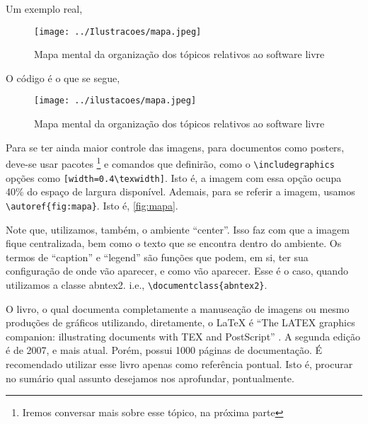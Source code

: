 \documentclass[12pt,
brazilian,
a5paper]{abntex2} %
\begin{document}
{        Um exemplo real,

        \begin{figure}[!htb]
          \begin{center}
            \caption{\label{fig:mapa}Mapa mental da organização dos tópicos relativos ao software livre}
            \texttt{[image: ../Ilustracoes/mapa.jpeg]}
          \end{center}
        \end{figure}

        \clearpage

        O código é o que se segue,


        \begin{verbnobox}[\fontsize{9.5pt}{9.5pt}\selectfont]
          \begin{figure}[!htb]
            \begin{center}
              \caption{\label{fig:mapa}Mapa mental da organização dos tópicos relativos ao software livre}
              \texttt{[image: ../ilustacoes/mapa.jpeg]}
            \end{center}
          \end{figure}
        \end{verbnobox}


        Para se ter ainda maior controle das imagens, para documentos como
        \textsf{posters}, deve-se usar pacotes \footnote{Iremos conversar
          mais sobre esse tópico, na próxima parte} e comandos que definirão,
        como o \verb+\includegraphics+ opções como
        \verb+[width=0.4\texwidth]+. Isto é, a imagem com essa opção ocupa
        40\% do espaço de largura disponível. Ademais, para se referir
        a imagem, usamos \verb+\autoref{fig:mapa}+. Isto é,
        \autoref{fig:mapa}.

        Note que, utilizamos, também, o ambiente ``center''. Isso faz com
        que a imagem fique centralizada, bem como o texto que se encontra
        dentro do ambiente. Os termos de ``caption'' e ``legend'' são
        funções que podem, em si, ter sua configuração de onde vão
        aparecer, e como vão aparecer. Esse é o caso, quando utilizamos a
        classe abntex2. i.e., \verb+\documentclass{abntex2}+. \cite{abntex2}

        O livro, o qual documenta completamente a manuseação de imagens ou
        mesmo produções de gráficos utilizando, diretamente, o \LaTeX{} é
        ``The LATEX graphics companion: illustrating documents with TEX
        and PostScript'' \cite{goossens1997}. A segunda edição é de 2007,
        e mais atual. Porém, possui 1000 páginas de documentação. É
        recomendado utilizar esse livro apenas como referência
        pontual. Isto é, procurar no sumário qual assunto desejamos nos
        aprofundar, pontualmente.


}
\end{document}
